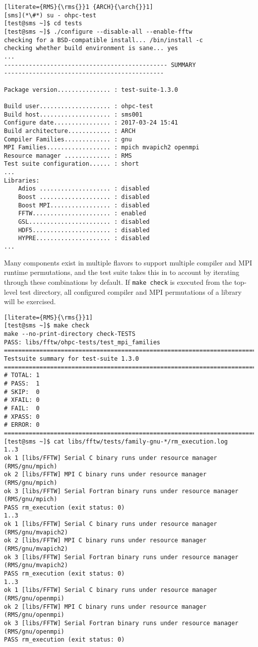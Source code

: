 \begin{lstlisting}[literate={RMS}{\rms{}}1 {ARCH}{\arch{}}1]
[sms](*\#*) su - ohpc-test
[test@sms ~]$ cd tests
[test@sms ~]$ ./configure --disable-all --enable-fftw
checking for a BSD-compatible install... /bin/install -c
checking whether build environment is sane... yes
...
---------------------------------------------- SUMMARY
---------------------------------------------

Package version............... : test-suite-1.3.0

Build user.................... : ohpc-test
Build host.................... : sms001
Configure date................ : 2017-03-24 15:41
Build architecture............ : ARCH
Compiler Families............. : gnu
MPI Families.................. : mpich mvapich2 openmpi
Resource manager ............. : RMS
Test suite configuration...... : short
...
Libraries:
    Adios .................... : disabled
    Boost .................... : disabled
    Boost MPI................. : disabled
    FFTW...................... : enabled
    GSL....................... : disabled
    HDF5...................... : disabled
    HYPRE..................... : disabled
...
\end{lstlisting}

Many \OHPC{} components exist in multiple flavors to support multiple compiler
and MPI runtime permutations, and the test suite takes this in to account by
iterating through these combinations by default. If \texttt{make check} is
executed from the top-level test directory, all configured compiler and MPI
permutations of a library will be exercised.

\begin{lstlisting}[literate={RMS}{\rms{}}1]
[test@sms ~]$ make check
make --no-print-directory check-TESTS
PASS: libs/fftw/ohpc-tests/test_mpi_families
============================================================================
Testsuite summary for test-suite 1.3.0
============================================================================
# TOTAL: 1
# PASS:  1
# SKIP:  0
# XFAIL: 0
# FAIL:  0
# XPASS: 0
# ERROR: 0
============================================================================
[test@sms ~]$ cat libs/fftw/tests/family-gnu-*/rm_execution.log 
1..3
ok 1 [libs/FFTW] Serial C binary runs under resource manager (RMS/gnu/mpich)
ok 2 [libs/FFTW] MPI C binary runs under resource manager (RMS/gnu/mpich)
ok 3 [libs/FFTW] Serial Fortran binary runs under resource manager (RMS/gnu/mpich)
PASS rm_execution (exit status: 0)
1..3
ok 1 [libs/FFTW] Serial C binary runs under resource manager (RMS/gnu/mvapich2)
ok 2 [libs/FFTW] MPI C binary runs under resource manager (RMS/gnu/mvapich2)
ok 3 [libs/FFTW] Serial Fortran binary runs under resource manager (RMS/gnu/mvapich2)
PASS rm_execution (exit status: 0)
1..3
ok 1 [libs/FFTW] Serial C binary runs under resource manager (RMS/gnu/openmpi)
ok 2 [libs/FFTW] MPI C binary runs under resource manager (RMS/gnu/openmpi)
ok 3 [libs/FFTW] Serial Fortran binary runs under resource manager (RMS/gnu/openmpi)
PASS rm_execution (exit status: 0)
\end{lstlisting}
